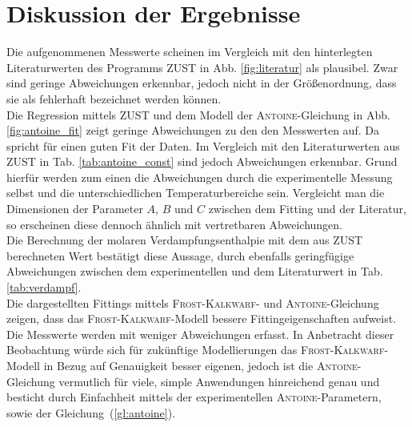 \section{Diskussion der Ergebnisse}
\label{sec:diskussion}

Die aufgenommenen Messwerte scheinen im Vergleich mit den hinterlegten Literaturwerten des Programms \textsc{ZUST} in Abb. \ref{fig:literatur} als plausibel. Zwar sind geringe Abweichungen erkennbar, jedoch nicht in der Größenordnung, dass sie als fehlerhaft bezeichnet werden können.\\
Die Regression mittels \textsc{ZUST} und dem Modell der \textsc{Antoine}-Gleichung in Abb.\ref{fig:antoine_fit} zeigt geringe Abweichungen zu den den Messwerten auf. Da spricht für einen guten Fit der Daten. Im Vergleich mit den Literaturwerten aus \textsc{ZUST} in Tab. \ref{tab:antoine_const} sind jedoch Abweichungen erkennbar. Grund hierfür werden zum einen die Abweichungen durch die experimentelle Messung selbst und die unterschiedlichen Temperaturbereiche sein. Vergleicht man die Dimensionen der Parameter $A$, $B$ und $C$ zwischen dem Fitting und der Literatur, so erscheinen diese dennoch ähnlich mit vertretbaren Abweichungen.\\
Die Berechnung der molaren Verdampfungsenthalpie mit dem aus \textsc{ZUST} berechneten Wert bestätigt diese Aussage, durch ebenfalls geringfügige Abweichungen zwischen dem experimentellen und dem Literaturwert in Tab. \ref{tab:verdampf}.\\
Die dargestellten Fittings mittels \textsc{Frost-Kalkwarf}- und \textsc{Antoine}-Gleichung zeigen, dass das \textsc{Frost-Kalkwarf}-Modell bessere Fittingeigenschaften aufweist. Die Messwerte werden mit weniger Abweichungen erfasst. In Anbetracht dieser Beobachtung würde sich  für zukünftige Modellierungen das \textsc{Frost-Kalkwarf}-Modell in Bezug auf Genauigkeit besser eigenen, jedoch ist die \textsc{Antoine}-Gleichung vermutlich für viele, simple Anwendungen hinreichend genau und besticht durch Einfachheit mittels der experimentellen \textsc{Antoine}-Parametern, sowie der \mbox{Gleichung (\ref{gl:antoine})}.

